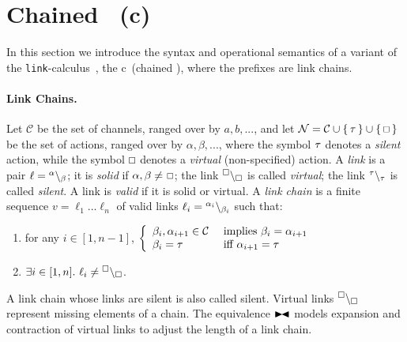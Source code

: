 
\section{Chained \CNA \ (c\CNA)}
\label{sec:ccna}

In this section we introduce  the syntax and operational semantics
of a variant of the {\tt link}-calculus~\cite{BodeiBB12}, the c\CNA\  (chained \CNA),
where the prefixes are link chains.

\paragraph{Link Chains.}
Let $\mathcal{C}$ be the set of channels, ranged over by $a,b,...$, and 
let $\mathcal{N} = \mathcal{C} \cup \{\, \tau \,\} \cup \{\, {\scriptstyle \square} \,\}$ be the set of actions, 
ranged over by $\alpha,\beta,...$,
where the symbol $\tau$ denotes a \emph{silent} action, while the symbol $\scriptstyle {\square}$ denotes a \emph{virtual} (non-specified) action.
A \emph{link} is a pair $\ell={}^{\alpha} \backslash_{\beta}$;
it is \emph{solid} if $\alpha,\beta \neq \ \noacts$; 
the link ${}^{\scriptstyle {\square}} \backslash_{\scriptstyle {\square}}$ is called \emph{virtual};
the link ${}^{\tau} \backslash_{\tau}$ is called \emph{silent}.
A link is \emph{valid} if it is solid or virtual.
%
A \emph{link chain} is a 
finite sequence $v = \ell_{1}...\ell_{n}$ of valid links  $\ell_{i} = {}^{\alpha_{i}} \backslash_{\beta_{i}}$ such that:
\begin{enumerate}
\item for any $i\in [1,n-1]$, 
$\left\{\begin{array}{ll}
\beta_{i},\alpha_{i+1}\in \mathcal{C} & \mbox{ implies } \beta_{i} = \alpha_{i+1}\\
\beta_{i}=\tau & \mbox{ iff } \alpha_{i+1}=\tau
\end{array}\right.
$
\item  $\exists i \in [1,n]. \ \ell_i \neq {}^{\scriptstyle {\square}} \backslash_{\scriptstyle {\square}}$.
\end{enumerate}

A link chain whose links are silent is also called silent.
Virtual links ${}^{\scriptstyle {\square}} \backslash_{\scriptstyle {\square}}$ represent missing elements of a chain. 
The equivalence $\blackstretcheq$ models expansion and contraction of virtual links to adjust the length of a link chain.


